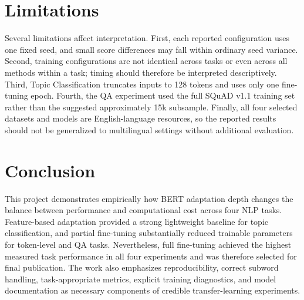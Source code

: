 \documentclass[conference]{IEEEtran}
\begin{document}
\section{Limitations}
Several limitations affect interpretation. First, each reported configuration uses one fixed seed, and small score differences may fall within ordinary seed variance. Second, training configurations are not identical across tasks or even across all methods within a task; timing should therefore be interpreted descriptively. Third, Topic Classification truncates inputs to 128 tokens and uses only one fine-tuning epoch. Fourth, the QA experiment used the full SQuAD v1.1 training set rather than the suggested approximately 15k subsample. Finally, all four selected datasets and models are English-language resources, so the reported results should not be generalized to multilingual settings without additional evaluation.

\section{Conclusion}
This project demonstrates empirically how BERT adaptation depth changes the balance between performance and computational cost across four NLP tasks. Feature-based adaptation provided a strong lightweight baseline for topic classification, and partial fine-tuning substantially reduced trainable parameters for token-level and QA tasks. Nevertheless, full fine-tuning achieved the highest measured task performance in all four experiments and was therefore selected for final publication. The work also emphasizes reproducibility, correct subword handling, task-appropriate metrics, explicit training diagnostics, and model documentation as necessary components of credible transfer-learning experiments.
\end{document}
